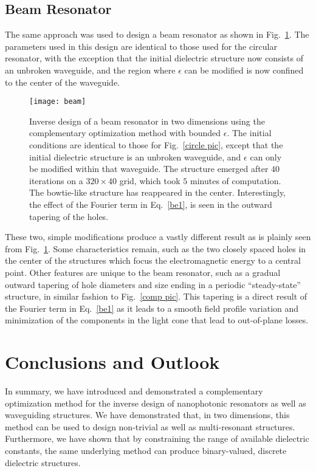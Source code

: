 \documentclass[10pt,letterpaper]{article}
\begin{document}
\subsection{Beam Resonator}
The same approach was used to design a beam resonator as shown in Fig.~\ref{line pic}. The parameters used in this design are identical to those used for the circular resonator, with the exception that the initial dielectric structure now consists of an unbroken waveguide, and the region where $\epsilon$ can be modified is now confined to the center of the waveguide.
\begin{figure}[htbp]\centering
\texttt{[image: beam]}
\caption{Inverse design of a beam resonator in two dimensions using the complementary optimization method with bounded $\epsilon$. The initial conditions are identical to those for Fig.~\ref{circle pic}, except that the initial dielectric structure is an unbroken waveguide, and $\epsilon$ can only be modified within that waveguide. The structure emerged after $40$ iterations on a $320\times 40$ grid, which took $5$ minutes of computation. The bowtie-like structure has reappeared in the center. Interestingly, the effect of the Fourier term in Eq.~\eqref{be1}, is seen in the outward tapering of the holes.}
\label{line pic}
\end{figure}

These two, simple modifications produce a vastly different result as is plainly seen from Fig.~\ref{line pic}. Some characteristics remain, such as the two closely spaced holes in the center of the structures which focus the electromagnetic energy to a central point. Other features are unique to the beam resonator, such as a gradual outward tapering of hole diameters and size ending in a periodic ``steady-state'' structure, in similar fashion to Fig.~\ref{comp pic}. This tapering is a direct result of the Fourier term in Eq.~\eqref{be1} as it leads to a smooth field profile variation and minimization of the components in the light cone that lead to out-of-plane losses\cite{Vuc05,Aka05}.

\section{Conclusions and Outlook}
In summary, we have introduced and demonstrated a complementary optimization method for the inverse design of nanophotonic resonators as well as waveguiding structures. We have demonstrated that, in two dimensions, this method can be used to design non-trivial as well as multi-resonant structures. Furthermore, we have shown that by constraining the range of available dielectric constants, the same underlying method can produce binary-valued, discrete dielectric structures. 
\end{document}
